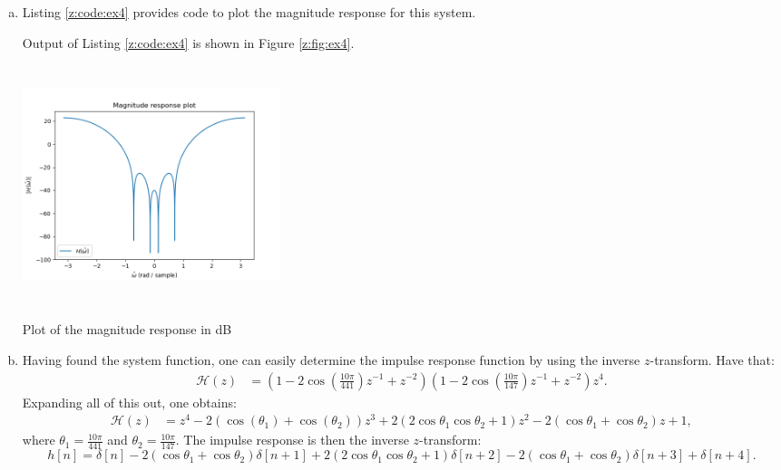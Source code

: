 \begin{enumerate}
\begin{enumerate}[a)]
\item Listing \ref{z:code:ex4} provides code to plot the magnitude response for this system.


Output of Listing \ref{z:code:ex4} is shown in Figure \ref{z:fig:ex4}.

\begin{marginfigure}
\includegraphics[width=7.5cm,height=7.0cm]{ch18/figures/mag2.png}
\caption{Plot of the magnitude response in dB}
\label{z:fig:ex4}
\end{marginfigure}

\item Having found the system function, one can easily determine the impulse response function by using the inverse $z$-transform. Have that:
\begin{align*}
    \mathcal{H}(z)&=(1-2\cos\left(\frac{10\pi}{441}\right)z^{-1}+z^{-2})(1-2\cos\left(\frac{10\pi}{147}\right)z^{-1}+z^{-2})z^{4}. 
\end{align*}
Expanding all of this out, one obtains:
\begin{align*}
    \mathcal{H}(z)&=z^{4} -2(\cos(\theta_1)+\cos(\theta_2))z^{3} + 2(2\cos\theta_1\cos\theta_2 + 1)z^{2} -2(\cos\theta_1+\cos\theta_2) z + 1,
\end{align*}
where $\theta_1=\frac{10\pi}{441}$ and $\theta_2=\frac{10\pi}{147}$. The impulse response is then the inverse $z$-transform:
$$h[n]=\delta[n] - 2(\cos\theta_1 + \cos\theta_2)\delta[n + 1] + 2(2\cos\theta_1\cos\theta_2+1)\delta[n + 2]-2(\cos\theta_1+\cos\theta_2)\delta[n + 3]+\delta[n + 4].$$

\end{enumerate}
\end{enumerate}
